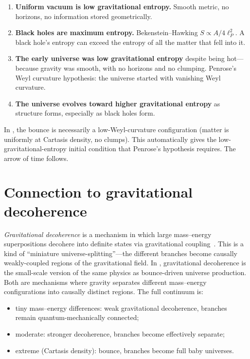 \begin{enumerate}
  \item \textbf{Uniform vacuum is low gravitational entropy.} Smooth metric, no
    horizons, no information stored geometrically.
  \item \textbf{Black holes are maximum entropy.} Bekenstein--Hawking
    $S \propto A/4\ell_P^2$. A black hole's entropy can exceed the entropy of all
    the matter that fell into it.
  \item \textbf{The early universe was low gravitational entropy} despite being
    hot---because gravity was smooth, with no horizons and no clumping. Penrose's
    Weyl curvature hypothesis: the universe started with vanishing Weyl
    curvature.
  \item \textbf{The universe evolves toward higher gravitational entropy} as
    structure forms, especially as black holes form.
\end{enumerate}

In \SCT, the bounce is necessarily a low-Weyl-curvature configuration (matter is
uniformly at Cartasis density, no clumps). This automatically gives the
low-gravitational-entropy initial condition that Penrose's hypothesis requires.
The arrow of time follows.

\section{Connection to gravitational decoherence}

\emph{Gravitational decoherence} is a mechanism in which large mass--energy
superpositions decohere into definite states via gravitational
coupling~\citep{diosi1989,penrose1996}. This is a kind of ``miniature
universe-splitting''---the different branches become causally weakly-coupled
regions of the gravitational field. In \SCT, gravitational decoherence is the
small-scale version of the same physics as bounce-driven universe production.
Both are mechanisms where gravity separates different mass--energy configurations
into causally distinct regions. The full continuum is:

\begin{itemize}
  \item tiny mass--energy differences: weak gravitational decoherence, branches
    remain quantum-mechanically connected;
  \item moderate: stronger decoherence, branches become effectively separate;
  \item extreme (Cartasis density): bounce, branches become full baby universes.
\end{itemize}


